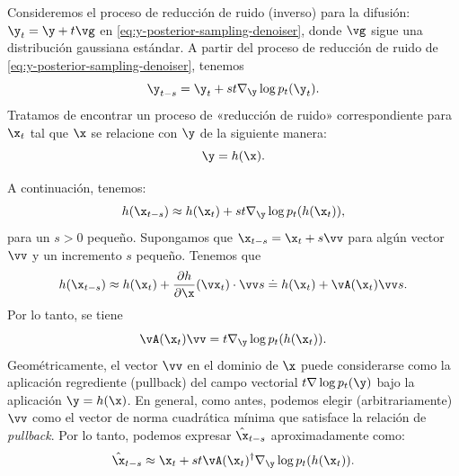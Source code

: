 \documentclass[../../book-main_es.tex]{subfiles}
\begin{document}
Consideremos el proceso de reducción de ruido (inverso) para la difusión: $\y_t =
\y + t\vg $ en \eqref{eq:y-posterior-sampling-denoiser}, donde $\vg$
sigue una distribución gaussiana estándar. A partir del proceso de reducción de ruido de
\eqref{eq:y-posterior-sampling-denoiser}, tenemos
\begin{equation}
    \y_{t-s} =  \y_t + st \nabla_{\y} \log p_t(\y_t).
\end{equation}
Tratamos de encontrar un proceso de «reducción de ruido» correspondiente para $\x_t$ tal
que $\x$ se relacione con $\y$ de la siguiente manera:
\begin{equation}
    \y =  h(\x).
\end{equation}

A continuación, tenemos:
\begin{equation}
    h(\x_{t-s}) \approx h(\x_t) + st \nabla_{\y} \log p_t(h(\x_t)),
\end{equation}
para un $s > 0$ pequeño.
Supongamos que $\x_{t-s} = \x_t + s \vv$ para algún vector $\vv$ y un
incremento $s$ pequeño. Tenemos que
\begin{equation}
    h(\x_{t-s}) \approx h(\x_t) + \frac{\partial h}{\partial
    \x}(\vx_{t}) \cdot \vv s \doteq h(\x_t) + \vA(\x_t) \vv s.
\end{equation}
Por lo tanto, se tiene
\begin{equation}
    \vA(\x_t) \vv = t \nabla_{\y} \log p_t(h(\x_t)).
    \label{eqn:pushforward}
\end{equation}
Geométricamente, el vector $\vv$ en el dominio de $\x$ puede considerarse como
la aplicación regrediente (pullback) del campo vectorial $t \nabla \log p_t(\y)$ bajo la
aplicación $\y = h(\x)$. En general, como antes, podemos elegir (arbitrariamente)
$\vv$ como el vector de norma cuadrática mínima que satisface la relación de \textit{pullback}.
Por lo tanto, podemos expresar  $\hat{\x}_{t-s}$ aproximadamente como:
\begin{equation}
    \hat{\x}_{t-s} \approx \x_t + st\vA(\x_t)^\dagger \nabla_{\y}
    \log p_t(h(\x_t)).
    \label{eqn:pullback-denoise}
\end{equation}
\end{document}
